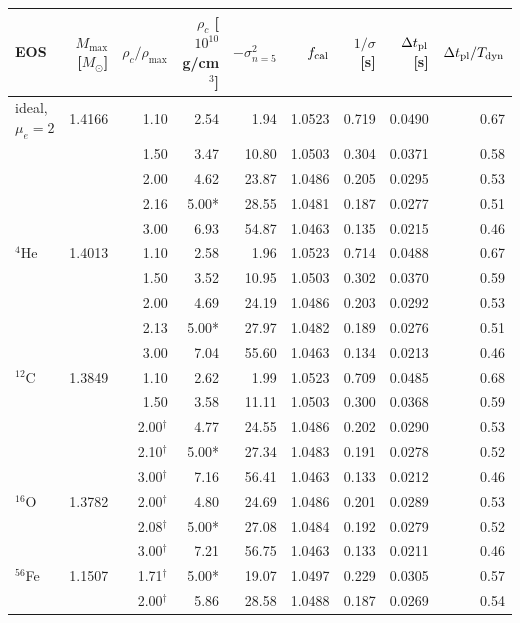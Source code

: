 \documentclass[11pt]{article}
\begin{document}
\begin{table}[h]
\centering
\scriptsize
\begin{tabular}{lrrrrrrrr}
\hline
EOS & $M_{\max}$ [$M_\odot$] & $\rho_c/\rho_{\max}$ & $\rho_c$ [$10^{10}$ g/cm$^3$] & $-\sigma^2_{n=5}$ & $f_{\rm cal}$ & $1/\sigma$ [s] & $\Delta t_{\rm pl}$ [s] & $\Delta t_{\rm pl}/T_{\rm dyn}$ \\
\hline
ideal, $\mu_e=2$ & 1.4166 & 1.10 & 2.54 & 1.94 & 1.0523 & 0.719 & 0.0490 & 0.67 \\
 &  & 1.50 & 3.47 & 10.80 & 1.0503 & 0.304 & 0.0371 & 0.58 \\
 &  & 2.00 & 4.62 & 23.87 & 1.0486 & 0.205 & 0.0295 & 0.53 \\
 &  & 2.16 & 5.00* & 28.55 & 1.0481 & 0.187 & 0.0277 & 0.51 \\
 &  & 3.00 & 6.93 & 54.87 & 1.0463 & 0.135 & 0.0215 & 0.46 \\
$^{4}$He & 1.4013 & 1.10 & 2.58 & 1.96 & 1.0523 & 0.714 & 0.0488 & 0.67 \\
 &  & 1.50 & 3.52 & 10.95 & 1.0503 & 0.302 & 0.0370 & 0.59 \\
 &  & 2.00 & 4.69 & 24.19 & 1.0486 & 0.203 & 0.0292 & 0.53 \\
 &  & 2.13 & 5.00* & 27.97 & 1.0482 & 0.189 & 0.0276 & 0.51 \\
 &  & 3.00 & 7.04 & 55.60 & 1.0463 & 0.134 & 0.0213 & 0.46 \\
$^{12}$C & 1.3849 & 1.10 & 2.62 & 1.99 & 1.0523 & 0.709 & 0.0485 & 0.68 \\
 &  & 1.50 & 3.58 & 11.11 & 1.0503 & 0.300 & 0.0368 & 0.59 \\
 &  & 2.00$^\dagger$ & 4.77 & 24.55 & 1.0486 & 0.202 & 0.0290 & 0.53 \\
 &  & 2.10$^\dagger$ & 5.00* & 27.34 & 1.0483 & 0.191 & 0.0278 & 0.52 \\
 &  & 3.00$^\dagger$ & 7.16 & 56.41 & 1.0463 & 0.133 & 0.0212 & 0.46 \\
$^{16}$O & 1.3782 & 2.00$^\dagger$ & 4.80 & 24.69 & 1.0486 & 0.201 & 0.0289 & 0.53 \\
 &  & 2.08$^\dagger$ & 5.00* & 27.08 & 1.0484 & 0.192 & 0.0279 & 0.52 \\
 &  & 3.00$^\dagger$ & 7.21 & 56.75 & 1.0463 & 0.133 & 0.0211 & 0.46 \\
$^{56}$Fe & 1.1507 & 1.71$^\dagger$ & 5.00* & 19.07 & 1.0497 & 0.229 & 0.0305 & 0.57 \\
 &  & 2.00$^\dagger$ & 5.86 & 28.58 & 1.0488 & 0.187 & 0.0269 & 0.54 \\

\end{tabular}
\end{table}
\end{document}
